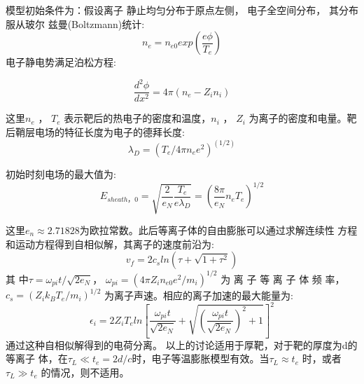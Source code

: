  模型初始条件为：假设离子
静止均匀分布于原点左侧， 电子全空间分布， 其分布服从玻尔
兹曼(Boltzmann)统计:
\begin{equation}
\label{eqn:electronBoltz}
n_e = n_{e0} exp(\frac{e\phi}{T_e})
\end{equation}
电子静电势满足泊松方程:

\begin{equation}
\label{eqn:electronBoltz}
\frac{d^2\phi}{dx^2} =4\pi (n_e-Z_i  n_i) 
\end{equation}

这里$n_e$ ， $T_e$ 表示靶后的热电子的密度和温度，$n_i$ ， $Z_i$ 为离子的密度和电量。靶
后鞘层电场的特征长度为电子的德拜长度:
\begin{equation}
\label{eqn:debyeLength}
\lambda_D = (T_e /4πn_e e^2)^(1/2)
\end{equation}

初始时刻电场的最大值为:
\begin{equation}
\label{eqn:maxField}
E_{sheath，0}=\sqrt{\frac{2}{e_N} \frac{T_e}{e {\lambda}_D}}=(\frac{8 
\pi}{e_N} 
n_e T_e)^{1/2}
\end{equation}

这里$e_n \approx 2.71828$为欧拉常数。此后等离子体的自由膨胀可以通过求解连续性
方程和运动方程得到自相似解，其离子的速度前沿为:
\begin{equation}
\label{eqn:frontVelocity}
v_f=2c_s ln(\tau + \sqrt{1+{\tau}^2})
\end{equation}
其 中$\tau = \omega_{pi} t / \sqrt{2e_N}$，  $\omega_{pi} = (4\pi Z_i n_{e0} 
e^2/m_i )^{1/2}$ 为 离 子 等 离 子 体 频 率，$c_s =
(Z_i k_B T_e /m_i )^{1/2}$ 为离子声速。相应的离子加速的最大能量为:
\begin{equation}
\label{eqn:maxEnergy}
\epsilon_i = 2 Z_i T_e{ln \left [ \frac{\omega_{pi} 
t}{\sqrt{2e_N}}+\sqrt{(\frac{\omega_{pi}t}{\sqrt{2e_N}})^2+1} \right ]}^2
\end{equation}
通过这种自相似解得到的电荷分离。 以上的讨论适用于厚靶，对于靶的厚度为d的等离子
体，在$\tau_L \ll t_e=2d/c $时，电子等温膨胀模型有效。当$\tau_L \approx t_e$ 时，或者 $\tau_L \gg t_e$ 的情况，则不适用。











